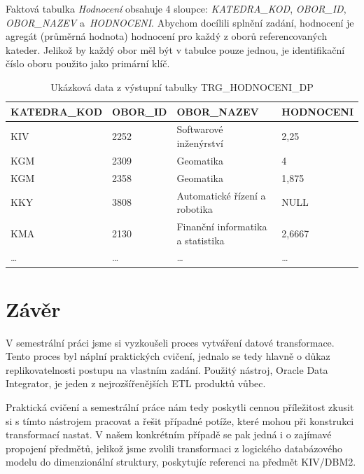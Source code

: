 Faktová tabulka \textit{Hodnocení} obsahuje 4 sloupce: \textit{KATEDRA\_KOD}, \textit{OBOR\_ID}, \textit{OBOR\_NAZEV} a~\textit{HODNOCENI}.
Abychom docílili splnění zadání, hodnocení je agregát (průměrná hodnota) hodnocení pro každý z oborů referencovaných kateder.
Jelikož by každý obor měl být v tabulce pouze jednou, je identifikační číslo oboru použito jako primární klíč.

\begin{table}[htb]
    \centering

    \begin{tabular}{llll}
        \toprule

        KATEDRA\_KOD    & OBOR\_ID  & OBOR\_NAZEV                       & HODNOCENI \\ \midrule
        KIV             & 2252      & Softwarové inženýrství            & 2,25      \\
        KGM             & 2309      & Geomatika                         & 4         \\
        KGM             & 2358      & Geomatika                         & 1,875     \\
        KKY             & 3808      & Automatické řízení a robotika     & NULL      \\
        KMA             & 2130      & Finanční informatika a statistika & 2,6667    \\
        \ldots          & \ldots    & \ldots                            & \ldots    \\

        \bottomrule
    \end{tabular}

    \caption{Ukázková data z výstupní tabulky TRG\_HODNOCENI\_DP}
    \label{table:table2}
\end{table}
\FloatBarrier

\section{Závěr}

V semestrální práci jsme si vyzkoušeli proces vytváření datové transformace.
Tento proces byl náplní praktických cvičení, jednalo se tedy hlavně o důkaz replikovatelnosti postupu na vlastním zadání.
Použitý nástroj, Oracle Data Integrator, je jeden z nejrozšířenějších ETL produktů vůbec.

Praktická cvičení a semestrální práce nám tedy poskytli cennou příležitost zkusit si s tímto nástrojem pracovat a řešit případné potíže, které mohou při konstrukci transformací nastat.
V našem konkrétním případě se pak jedná i o zajímavé propojení předmětů, jelikož jsme zvolili transformaci z logického databázového modelu do dimenzionální struktury, poskytujíc referenci na předmět KIV/DBM2.

